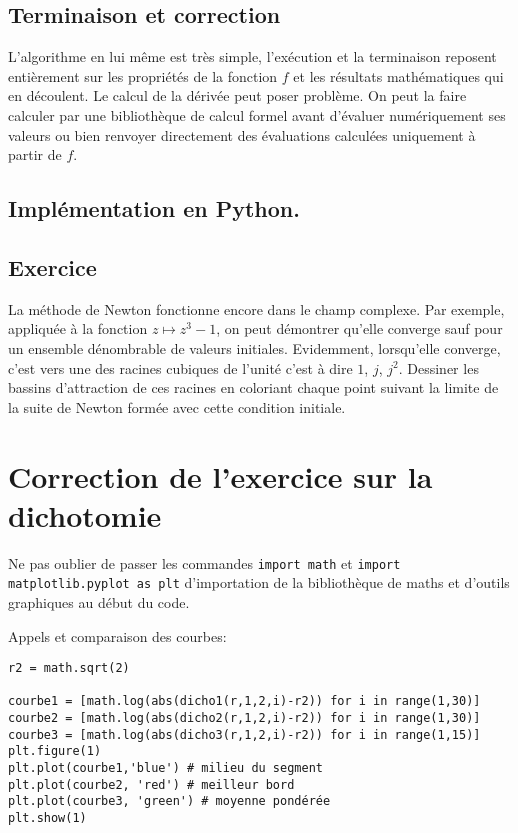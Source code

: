 \subsection{Terminaison et correction}
L'algorithme en lui même est très simple, l'exécution et la terminaison reposent entièrement sur les propriétés de la fonction $f$ et les résultats mathématiques qui en découlent.\newline
Le calcul de la dérivée peut poser problème. On peut la faire calculer par une bibliothèque de calcul formel avant d'évaluer numériquement ses valeurs ou bien renvoyer directement des évaluations calculées uniquement à partir de $f$.

\subsection{Implémentation en Python.}


\subsection{Exercice}
La méthode de Newton fonctionne encore dans le champ complexe. Par exemple, appliquée à la fonction $z\mapsto z^3 -1$, on peut démontrer qu'elle converge sauf pour un ensemble dénombrable de valeurs initiales. Evidemment, lorsqu'elle converge, c'est vers une des racines cubiques de l'unité c'est à dire $1$, $j$, $j^2$.\newline
Dessiner les bassins d'attraction de ces racines en coloriant chaque point suivant la limite de la suite de Newton formée avec cette condition initiale.

\section{Correction de l'exercice sur la dichotomie}
Ne pas oublier de passer les commandes \newline
\texttt{import math} et \texttt{import matplotlib.pyplot as plt}\newline
d'importation de la bibliothèque de maths et d'outils graphiques au début du code.



Appels et comparaison des courbes:
\begin{verbatim}
r2 = math.sqrt(2)

courbe1 = [math.log(abs(dicho1(r,1,2,i)-r2)) for i in range(1,30)]
courbe2 = [math.log(abs(dicho2(r,1,2,i)-r2)) for i in range(1,30)]
courbe3 = [math.log(abs(dicho3(r,1,2,i)-r2)) for i in range(1,15)]
plt.figure(1)
plt.plot(courbe1,'blue') # milieu du segment
plt.plot(courbe2, 'red') # meilleur bord
plt.plot(courbe3, 'green') # moyenne pondérée
plt.show(1)
\end{verbatim}

